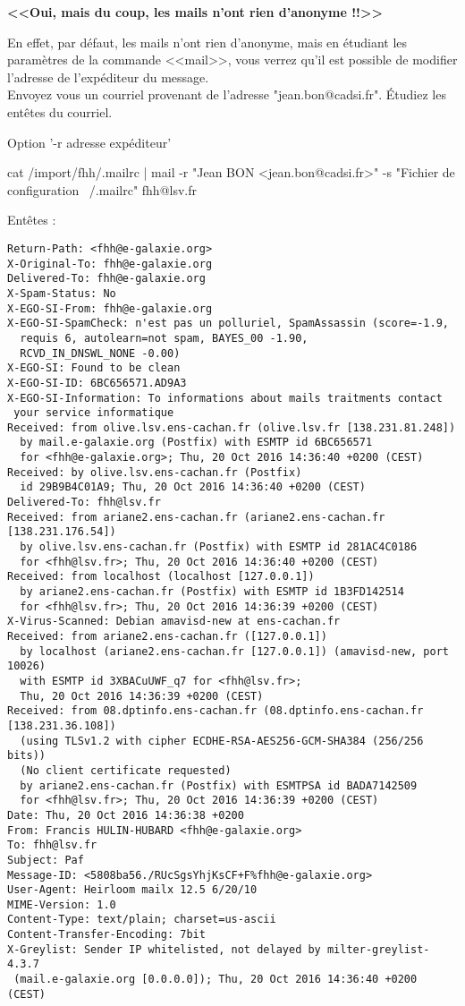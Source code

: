 \documentclass[11pt]{article}
\begin{document}
\begin{center}
 \textbf{<<Oui, mais du coup, les mails n'ont rien d'anonyme !!>>}
\end{center}

En effet, par défaut, les mails n'ont rien d'anonyme, mais en étudiant les
paramètres de la commande <<mail>>, vous verrez qu'il est possible de modifier
l'adresse de l'expéditeur du message.\\

Envoyez vous un courriel provenant de l'adresse "jean.bon@cadsi.fr". Étudiez
les entêtes du courriel.

\begin{solution}

Option '-r adresse expéditeur'

cat /import/fhh/.mailrc | mail -r "Jean BON <jean.bon@cadsi.fr>" -s "Fichier de configuration ~/.mailrc" fhh@lsv.fr

Entêtes :

\begin{verbatim}
Return-Path: <fhh@e-galaxie.org>
X-Original-To: fhh@e-galaxie.org
Delivered-To: fhh@e-galaxie.org
X-Spam-Status: No
X-EGO-SI-From: fhh@e-galaxie.org
X-EGO-SI-SpamCheck: n'est pas un polluriel, SpamAssassin (score=-1.9,
  requis 6, autolearn=not spam, BAYES_00 -1.90,
  RCVD_IN_DNSWL_NONE -0.00)
X-EGO-SI: Found to be clean
X-EGO-SI-ID: 6BC656571.AD9A3
X-EGO-SI-Information: To informations about mails traitments contact
 your service informatique
Received: from olive.lsv.ens-cachan.fr (olive.lsv.fr [138.231.81.248])
  by mail.e-galaxie.org (Postfix) with ESMTP id 6BC656571
  for <fhh@e-galaxie.org>; Thu, 20 Oct 2016 14:36:40 +0200 (CEST)
Received: by olive.lsv.ens-cachan.fr (Postfix)
  id 29B9B4C01A9; Thu, 20 Oct 2016 14:36:40 +0200 (CEST)
Delivered-To: fhh@lsv.fr
Received: from ariane2.ens-cachan.fr (ariane2.ens-cachan.fr [138.231.176.54])
  by olive.lsv.ens-cachan.fr (Postfix) with ESMTP id 281AC4C0186
  for <fhh@lsv.fr>; Thu, 20 Oct 2016 14:36:40 +0200 (CEST)
Received: from localhost (localhost [127.0.0.1])
  by ariane2.ens-cachan.fr (Postfix) with ESMTP id 1B3FD142514
  for <fhh@lsv.fr>; Thu, 20 Oct 2016 14:36:39 +0200 (CEST)
X-Virus-Scanned: Debian amavisd-new at ens-cachan.fr
Received: from ariane2.ens-cachan.fr ([127.0.0.1])
  by localhost (ariane2.ens-cachan.fr [127.0.0.1]) (amavisd-new, port 10026)
  with ESMTP id 3XBACuUWF_q7 for <fhh@lsv.fr>;
  Thu, 20 Oct 2016 14:36:39 +0200 (CEST)
Received: from 08.dptinfo.ens-cachan.fr (08.dptinfo.ens-cachan.fr [138.231.36.108])
  (using TLSv1.2 with cipher ECDHE-RSA-AES256-GCM-SHA384 (256/256 bits))
  (No client certificate requested)
  by ariane2.ens-cachan.fr (Postfix) with ESMTPSA id BADA7142509
  for <fhh@lsv.fr>; Thu, 20 Oct 2016 14:36:39 +0200 (CEST)
Date: Thu, 20 Oct 2016 14:36:38 +0200
From: Francis HULIN-HUBARD <fhh@e-galaxie.org>
To: fhh@lsv.fr
Subject: Paf
Message-ID: <5808ba56./RUcSgsYhjKsCF+F%fhh@e-galaxie.org>
User-Agent: Heirloom mailx 12.5 6/20/10
MIME-Version: 1.0
Content-Type: text/plain; charset=us-ascii
Content-Transfer-Encoding: 7bit
X-Greylist: Sender IP whitelisted, not delayed by milter-greylist-4.3.7 
 (mail.e-galaxie.org [0.0.0.0]); Thu, 20 Oct 2016 14:36:40 +0200 (CEST)


\end{verbatim}
\end{solution}
\end{document}
